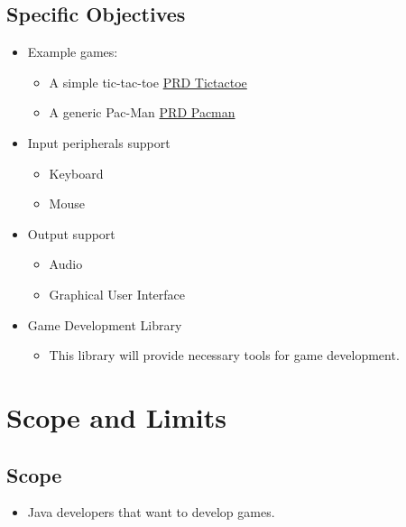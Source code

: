 \documentclass[a4paper,12pt]{article}
\begin{document}
\subsection{Specific Objectives}
\begin{itemize}
    \item Example games:
    \begin{itemize}
        \item A simple tic-tac-toe \href{https://docs.google.com/document/d/1MvlmgCBZvRrT61A3mnra-3bZ41zCcE_vmNHpHkZyQ2M/edit}{PRD Tictactoe}
        \item A generic Pac-Man \href{https://docs.google.com/document/d/1ST29Ap_2OGVEf--gPTfHYmAZrcIQC6jl6y32fM3UQWo/edit}{PRD Pacman}
    \end{itemize}
    \item Input peripherals support
    \begin{itemize}
        \item Keyboard
        \item Mouse
    \end{itemize}
    \item Output support
    \begin{itemize}
        \item Audio
        \item Graphical User Interface
    \end{itemize}
    \item Game Development Library
    \begin{itemize}
        \item This library will provide necessary tools for game development.
    \end{itemize}
\end{itemize}

\section{Scope and Limits}

\subsection{Scope}
\begin{itemize}
    \item Java developers that want to develop games.
\end{itemize}
\end{document}
